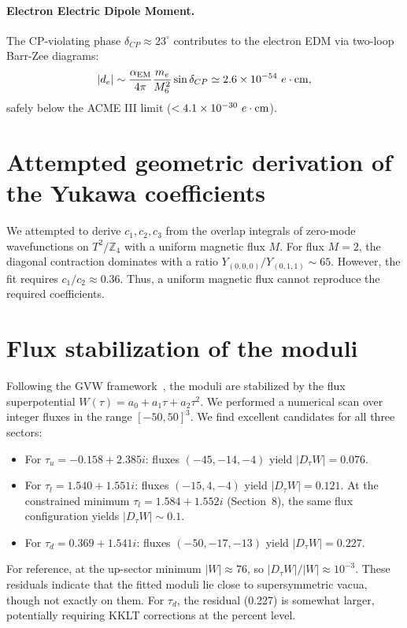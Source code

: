 \documentclass[12pt,a4paper]{article}
\numberwithin{equation}{section}
\begin{document}
\paragraph{Electron Electric Dipole Moment.}
The CP-violating phase \(\delta_{CP} \approx 23^\circ\) contributes to the electron EDM via two-loop Barr-Zee diagrams:
\begin{equation}
|d_e| \sim \frac{\alpha_{\rm EM}}{4\pi} \frac{m_e}{M_6^2} \sin\delta_{CP} \simeq 2.6 \times 10^{-54}~e\cdot{\rm cm},
\end{equation}
safely below the ACME III limit (\(< 4.1 \times 10^{-30}~e\cdot{\rm cm}\)).

\section{Attempted geometric derivation of the Yukawa coefficients}
\label{sec:negative_flux}
We attempted to derive \(c_1, c_2, c_3\) from the overlap integrals of zero-mode wavefunctions on \(T^2/\mathbb{Z}_4\) with a uniform magnetic flux \(M\). For flux \(M=2\), the diagonal contraction dominates with a ratio \(Y_{(0,0,0)}/Y_{(0,1,1)} \sim 65\). However, the fit requires \(c_1/c_2 \approx 0.36\). Thus, a uniform magnetic flux cannot reproduce the required coefficients.

\section{Flux stabilization of the moduli}
Following the GVW framework~\cite{GVW2000}, the moduli are stabilized by the flux superpotential \(W(\tau) = a_0 + a_1 \tau + a_2 \tau^2\). We performed a numerical scan over integer fluxes in the range \([-50, 50]^3\). We find excellent candidates for all three sectors:
\begin{itemize}
    \item For \(\tau_u = -0.158 + 2.385i\): fluxes \((-45, -14, -4)\) yield \(|D_\tau W| = 0.076\).
    \item For \(\tau_l = 1.540 + 1.551i\): fluxes \((-15, 4, -4)\) yield \(|D_\tau W| = 0.121\). At the constrained minimum \(\tau_l = 1.584 + 1.552i\) (Section~8), the same flux configuration yields \(|D_\tau W| \sim 0.1\).
    \item For \(\tau_d = 0.369 + 1.541i\): fluxes \((-50, -17, -13)\) yield \(|D_\tau W| = 0.227\).
\end{itemize}
For reference, at the up-sector minimum \(|W| \approx 76\), so \(|D_\tau W|/|W| \approx 10^{-3}\). These residuals indicate that the fitted moduli lie close to supersymmetric vacua, though not exactly on them. For \(\tau_d\), the residual (0.227) is somewhat larger, potentially requiring KKLT corrections at the percent level.
\end{document}
